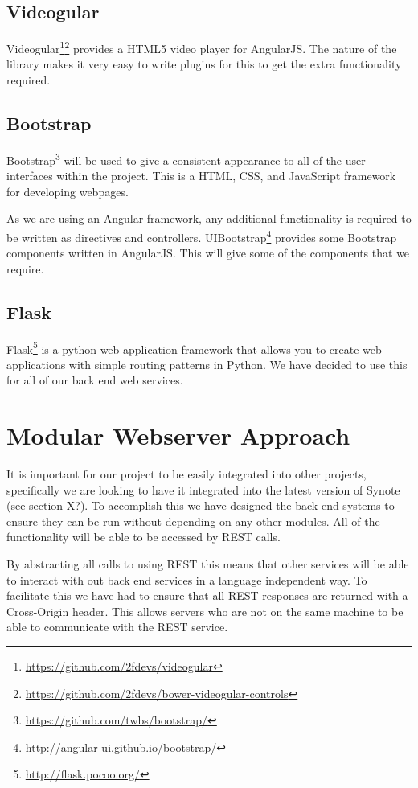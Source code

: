 \subsection{Videogular}
\label{Section:Videogular}
\gls{Videogular}\footnote{\url{https://github.com/2fdevs/videogular}}\footnote{\url{https://github.com/2fdevs/bower-videogular-controls}} provides a HTML5 video player for \gls{AngularJS}. The nature of the library makes it very easy to write plugins for this to get the extra functionality required.

\subsection{Bootstrap}
\label{Section:Bootstrap}
Bootstrap\footnote{\url{https://github.com/twbs/bootstrap/}} will be used to give a consistent appearance to all of the user interfaces within the project. This is a HTML, \gls{CSS}, and JavaScript framework for developing webpages.

As we are using an Angular framework, any additional functionality is required to be written as directives and controllers. UIBootstrap\footnote{\url{http://angular-ui.github.io/bootstrap/}} provides some Bootstrap components written in \gls{AngularJS}. This will give some of the components that we require.

\subsection{Flask}
\label{Section:Flask}
Flask\footnote{\url{http://flask.pocoo.org/}} is a python web application framework that allows you to create web applications with simple routing patterns in Python. We have decided to use this for all of our back end web services.

\section{Modular Webserver Approach}
\label{Section:Modular Approach}
It is important for our project to be easily integrated into other projects, specifically we are looking to have it integrated into the latest version of Synote (see section X?). To accomplish this we have designed the back end systems to ensure they can be run without depending on any other modules. All of the functionality will be able to be accessed by \gls{REST} calls.

By abstracting all calls to using \gls{REST} this means that other services will be able to interact with out back end services in a language independent way. To facilitate this we have had to ensure that all \gls{REST} responses are returned with a Cross-Origin header. This allows servers who are not on the same machine to be able to communicate with the \gls{REST} service.

